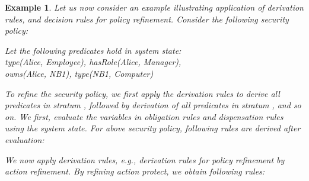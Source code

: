 \documentclass[12pt,journal,letterpaper,onecolumn]{IEEEtran}
\newtheorem{example}{Example}[section]
\begin{document}
\begin{example} Let us now consider an example illustrating
application of derivation rules, and decision rules for policy
refinement. Consider the following security policy:



\noindent
Let the following predicates hold in system state:\\
{\ttfamily type(Alice, Employee), hasRole(Alice, Manager), \\
 owns(Alice, NB1), type(NB1, Computer)}

To refine the security policy, we first apply the derivation rules to
derive all predicates in stratum , followed by derivation of
all predicates in stratum , and so on. We first, evaluate the
variables in obligation rules and dispensation rules using the
system state. For above security policy, following rules are
derived after evaluation:



We now apply derivation rules, e.g., derivation rules for policy
refinement by action refinement. By refining action protect, we
obtain following rules:



\end{example}
\end{document}
